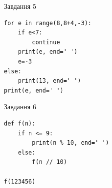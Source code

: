 \documentclass[12pt, ukrainian]{article}
\begin{document}
{\vspace{15mm}
\begin{minipage}[t]{9.7cm}                
{\begin{center}Завдання {5}\end{center}}
\begin{verbatim}
for e in range(8,8+4,-3):
    if e<7:
        continue
    print(e, end=' ')
    e=-3
else:
    print(13, end=' ')
print(e, end=' ')
\end{verbatim}     
\end{minipage}
\vline \hspace{8mm}
\begin{minipage}[t]{8.0cm}                
{\begin{center}Завдання {6}\end{center}}
\begin{verbatim}
def f(n):
    if n <= 9:
        print(n % 10, end=' ')
    else:
        f(n // 10)

f(123456)
\end{verbatim}     
\end{minipage}

}
\newpage
\end{document}
